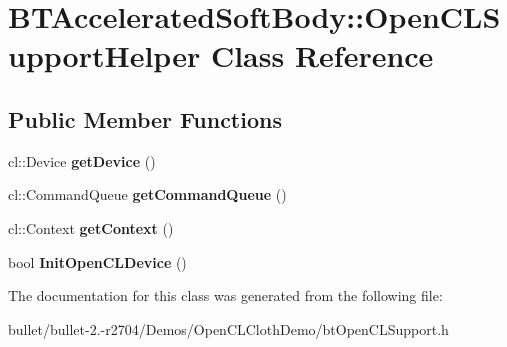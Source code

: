 \hypertarget{class_b_t_accelerated_soft_body_1_1_open_c_l_support_helper}{\section{B\+T\+Accelerated\+Soft\+Body\+:\+:Open\+C\+L\+Support\+Helper Class Reference}
\label{class_b_t_accelerated_soft_body_1_1_open_c_l_support_helper}
}
\subsection*{Public Member Functions}
\begin{DoxyCompactItemize}
\item 
\hypertarget{class_b_t_accelerated_soft_body_1_1_open_c_l_support_helper_a0715c06a873215edc596e1a6e3777695}{cl\+::\+Device {\bfseries get\+Device} ()}\label{class_b_t_accelerated_soft_body_1_1_open_c_l_support_helper_a0715c06a873215edc596e1a6e3777695}

\item 
\hypertarget{class_b_t_accelerated_soft_body_1_1_open_c_l_support_helper_adc95d7e7cb3ec8d226b086050dbb3106}{cl\+::\+Command\+Queue {\bfseries get\+Command\+Queue} ()}\label{class_b_t_accelerated_soft_body_1_1_open_c_l_support_helper_adc95d7e7cb3ec8d226b086050dbb3106}

\item 
\hypertarget{class_b_t_accelerated_soft_body_1_1_open_c_l_support_helper_a339200c8b292f56ff72dc7f52d7f34e1}{cl\+::\+Context {\bfseries get\+Context} ()}\label{class_b_t_accelerated_soft_body_1_1_open_c_l_support_helper_a339200c8b292f56ff72dc7f52d7f34e1}

\item 
\hypertarget{class_b_t_accelerated_soft_body_1_1_open_c_l_support_helper_a81afa12f21db1895043654dab055f208}{bool {\bfseries Init\+Open\+C\+L\+Device} ()}\label{class_b_t_accelerated_soft_body_1_1_open_c_l_support_helper_a81afa12f21db1895043654dab055f208}

\end{DoxyCompactItemize}


The documentation for this class was generated from the following file\+:\begin{DoxyCompactItemize}
\item 
bullet/bullet-\/2.-\/r2704/\+Demos/\+Open\+C\+L\+Cloth\+Demo/bt\+Open\+C\+L\+Support.\+h\end{DoxyCompactItemize}
